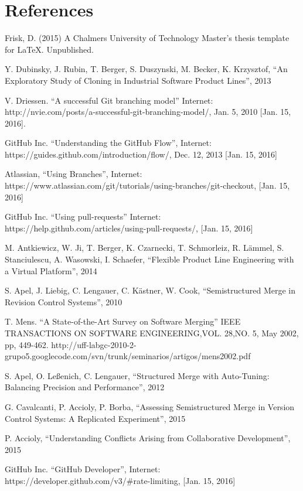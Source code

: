 \chapter{References}
\begin{thebibliography}{69}

 Frisk, D. (2015) A Chalmers University of Technology Master's thesis template for \LaTeX . Unpublished.

 Y. Dubinsky, J. Rubin, T. Berger, S. Duszynski, M. Becker, K. Krzysztof, “An Exploratory Study of Cloning in Industrial Software Product Lines”, 2013

 V. Driessen. “A successful Git branching model” Internet: http://nvie.com/posts/a-successful-git-branching-model/, Jan. 5, 2010 [Jan. 15, 2016].

 GitHub Inc. “Understanding the GitHub Flow”, Internet: https://guides.github.com/introduction/flow/, Dec. 12, 2013 [Jan. 15, 2016]

 Atlassian, “Using Branches”, Internet: https://www.atlassian.com/git/tutorials/using-branches/git-checkout, [Jan. 15, 2016]

 GitHub Inc. “Using pull-requests” Internet: https://help.github.com/articles/using-pull-requests/, [Jan. 15, 2016]

 M. Antkiewicz, W. Ji, T. Berger, K. Czarnecki, T. Schmorleiz, R. Lämmel, S. Stanciulescu, A. Wasowski, I. Schaefer, “Flexible Product Line Engineering with a Virtual Platform”, 2014

 S. Apel, J. Liebig, C. Lengauer, C. Kästner, W. Cook, “Semistructured Merge in Revision Control Systems”, 2010

 T. Mens. “A State-of-the-Art Survey on Software Merging” IEEE TRANSACTIONS ON SOFTWARE ENGINEERING,VOL. 28,NO. 5, May 2002, pp, 449-462.
http://uff-labgc-2010-2-grupo5.googlecode.com/svn/trunk/seminarios/artigos/mens2002.pdf

 S. Apel, O. Leßenich, C. Lengauer, “Structured Merge with Auto-Tuning: Balancing Precision and Performance”, 2012

 G. Cavalcanti, P. Accioly, P. Borba, “Assessing Semistructured Merge in Version Control Systems: A Replicated Experiment”, 2015

 P. Accioly, “Understanding Conflicts Arising from Collaborative Development”, 2015

 GitHub Inc. “GitHub Developer”, Internet: https://developer.github.com/v3/#rate-limiting, [Jan. 15, 2016]



\end{thebibliography}
